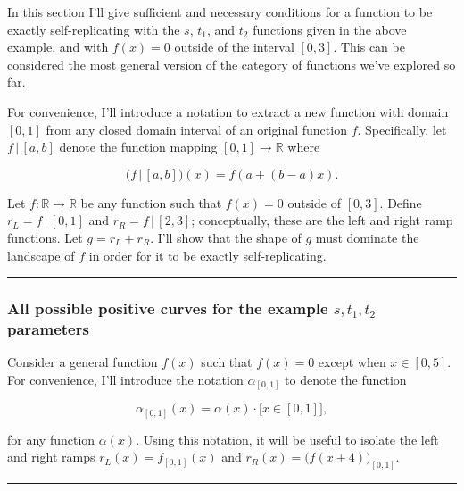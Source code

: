 \documentclass[]{article}
\begin{document}
In this section I'll give sufficient and necessary conditions for a
function to be exactly self-replicating with the \(s\), \(t_1\), and
\(t_2\) functions given in the above example, and with \(f(x)=0\)
outside of the interval \([0, 3]\). This can be considered the most
general version of the category of functions we've explored so far.

\newcommand{\restrict}{\,\big|\,}

For convenience, I'll introduce a notation to extract a new function
with domain \([0, 1]\) from any closed domain interval of an original
function \(f\). Specifically, let \(f \restrict [a, b]\) denote the
function mapping \([0,1]\to\mathbb{R}\) where

\[
\big(f \restrict [a,b]\big)(x) = f(a + (b-a)x).
\]

Let \(f:\mathbb{R}\to\mathbb{R}\) be any function such that \(f(x)=0\)
outside of \([0, 3]\). Define \(r_L = f\restrict [0, 1]\) and
\(r_R = f\restrict [2,3]\); conceptually, these are the left and right
ramp functions. Let \(g = r_L + r_R\). I'll show that the shape of \(g\)
must dominate the landscape of \(f\) in order for it to be exactly
self-replicating.

\begin{center}\rule{0.5\linewidth}{\linethickness}\end{center}

\subsubsection{\texorpdfstring{All possible positive curves for the
example \(s,t_1,t_2\)
parameters}{All possible positive curves for the example s,t\_1,t\_2 parameters}}\label{all-possible-positive-curves-for-the-example-stux5f1tux5f2-parameters}

Consider a general function \(f(x)\) such that \(f(x)=0\) except when
\(x \in [0, 5]\). For convenience, I'll introduce the notation
\(\alpha_{[0,1]}\) to denote the function

\[\alpha_{[0,1]}(x) = \alpha(x) \cdot \big[ x\in [0,1] \big],\]

for any function \(\alpha(x)\). Using this notation, it will be useful
to isolate the left and right ramps \(r_L(x) = f_{[0,1]}(x)\) and
\(r_R(x) = \big(f(x + 4)\big)_{[0,1]}\).

\begin{center}\rule{0.5\linewidth}{\linethickness}\end{center}
\end{document}
